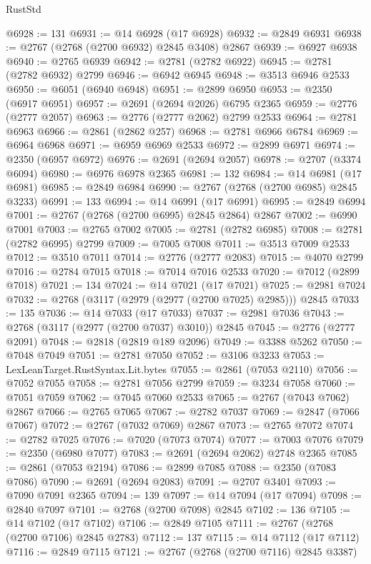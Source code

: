 \begin{lexlean}{RustStd}
\begin{coremodule}
@6928 := 131
@6931 := @14 @6928 (@17 @6928)
@6932 := @2849 @6931
@6938 := @2767 (@2768 (@2700 @6932) @2845 @3408) @2867
@6939 := @6927 @6938
@6940 := @2765 @6939
@6942 := @2781 (@2782 @6922)
@6945 := @2781 (@2782 @6932) @2799
@6946 := @6942 @6945
@6948 := @3513 @6946 @2533
@6950 := @6051 (@6940 @6948)
@6951 := @2899 @6950
@6953 := @2350 (@6917 @6951)
@6957 := @2691 (@2694 @2026) @6795 @2365
@6959 := @2776 (@2777 @2057)
@6963 := @2776 (@2777 @2062) @2799 @2533
@6964 := @2781 @6963
@6966 := @2861 (@2862 @257)
@6968 := @2781 @6966 @6784
@6969 := @6964 @6968
@6971 := @6959 @6969 @2533
@6972 := @2899 @6971
@6974 := @2350 (@6957 @6972)
@6976 := @2691 (@2694 @2057)
@6978 := @2707 (@3374 @6094)
@6980 := @6976 @6978 @2365
@6981 := 132
@6984 := @14 @6981 (@17 @6981)
@6985 := @2849 @6984
@6990 := @2767 (@2768 (@2700 @6985) @2845 @3233)
@6991 := 133
@6994 := @14 @6991 (@17 @6991)
@6995 := @2849 @6994
@7001 := @2767 (@2768 (@2700 @6995) @2845 @2864) @2867
@7002 := @6990 @7001
@7003 := @2765 @7002
@7005 := @2781 (@2782 @6985)
@7008 := @2781 (@2782 @6995) @2799
@7009 := @7005 @7008
@7011 := @3513 @7009 @2533
@7012 := @3510 @7011
@7014 := @2776 (@2777 @2083)
@7015 := @4070 @2799
@7016 := @2784 @7015
@7018 := @7014 @7016 @2533
@7020 := @7012 (@2899 @7018)
@7021 := 134
@7024 := @14 @7021 (@17 @7021)
@7025 := @2981 @7024
@7032 := @2768 (@3117 (@2979 (@2977 (@2700 @7025) @2985))) @2845
@7033 := 135
@7036 := @14 @7033 (@17 @7033)
@7037 := @2981 @7036
@7043 := @2768 (@3117 (@2977 (@2700 @7037) @3010)) @2845
@7045 := @2776 (@2777 @2091)
@7048 := @2818 (@2819 @189 @2096)
@7049 := @3388 @5262
@7050 := @7048 @7049
@7051 := @2781 @7050
@7052 := @3106 @3233
@7053 := LexLeanTarget.RustSyntax.Lit.bytes
@7055 := @2861 (@7053 @2110)
@7056 := @7052 @7055
@7058 := @2781 @7056 @2799
@7059 := @3234 @7058
@7060 := @7051 @7059
@7062 := @7045 @7060 @2533
@7065 := @2767 (@7043 @7062) @2867
@7066 := @2765 @7065
@7067 := @2782 @7037
@7069 := @2847 (@7066 @7067)
@7072 := @2767 (@7032 @7069) @2867
@7073 := @2765 @7072
@7074 := @2782 @7025
@7076 := @7020 (@7073 @7074)
@7077 := @7003 @7076
@7079 := @2350 (@6980 @7077)
@7083 := @2691 (@2694 @2062) @2748 @2365
@7085 := @2861 (@7053 @2194)
@7086 := @2899 @7085
@7088 := @2350 (@7083 @7086)
@7090 := @2691 (@2694 @2083)
@7091 := @2707 @3401
@7093 := @7090 @7091 @2365
@7094 := 139
@7097 := @14 @7094 (@17 @7094)
@7098 := @2840 @7097
@7101 := @2768 (@2700 @7098) @2845
@7102 := 136
@7105 := @14 @7102 (@17 @7102)
@7106 := @2849 @7105
@7111 := @2767 (@2768 (@2700 @7106) @2845 @2783)
@7112 := 137
@7115 := @14 @7112 (@17 @7112)
@7116 := @2849 @7115
@7121 := @2767 (@2768 (@2700 @7116) @2845 @3387)

\end{coremodule}
\end{lexlean}
